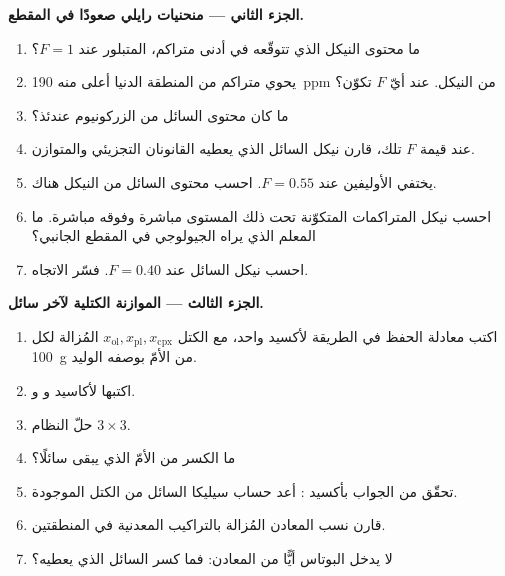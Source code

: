 \begin{problem}
\noindent\textbf{الجزء الثاني --- منحنيات رايلي صعودًا في المقطع.}
\begin{enumerate}[resume]
\item ما محتوى النيكل الذي تتوقّعه في أدنى متراكم، المتبلور عند
$F = 1$؟
\item يحوي متراكم من المنطقة الدنيا أعلى منه \qty{190}{ppm} من النيكل. عند أيّ $F$
تكوّن؟
\item ما كان محتوى السائل من الزركونيوم عندئذ؟
\item عند قيمة $F$ تلك، قارن نيكل السائل الذي يعطيه القانونان التجزيئي
والمتوازن.
\item يختفي الأوليفين عند $F = 0.55$. احسب محتوى السائل من النيكل
هناك.
\item احسب نيكل المتراكمات المتكوّنة تحت ذلك المستوى مباشرة وفوقه مباشرة.
ما المعلم الذي يراه الجيولوجي في المقطع الجانبي؟
\item احسب نيكل السائل  عند $F = 0.40$. فسّر
الاتجاه.
\end{enumerate}

\noindent\textbf{الجزء الثالث --- الموازنة الكتلية لآخر سائل.}
\begin{enumerate}[resume]
\item اكتب معادلة الحفظ في الطريقة لأكسيد واحد، مع الكتل
$x_{\mathrm{ol}}, x_{\mathrm{pl}}, x_{\mathrm{cpx}}$ المُزالة لكل \qty{100}{g} من
الأمّ  بوصفه الوليد.
\item اكتبها لأكاسيد  و و.
\item حلّ النظام $3 \times 3$.
\item ما الكسر من الأمّ الذي يبقى سائلًا؟
\item تحقّق من الجواب بأكسيد : أعد حساب سيليكا السائل من
الكتل الموجودة.
\item قارن نسب المعادن المُزالة بالتراكيب المعدنية في
المنطقتين.
\item لا يدخل البوتاس أيًّا من المعادن: فما كسر السائل الذي يعطيه؟
\end{enumerate}


\end{problem}
